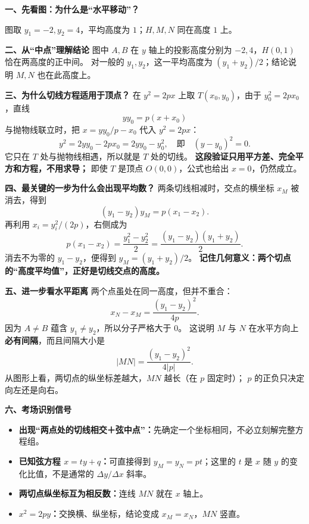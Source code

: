 \clearpage
\begin{explanationbox}
\textbf{\textcolor{CExplanation}{一、先看图：为什么是“水平移动”？}}
\par\noindent\begin{minipage}{\linewidth}
\begin{center}


图取 $y_1=-2,y_2=4$，平均高度为 $1$；$H,M,N$ 同在高度 $1$ 上。
\end{center}
\end{minipage}\par

\medskip
\textbf{\textcolor{CExplanation}{二、从“中点”理解结论}}
图中 $A,B$ 在 $y$ 轴上的投影高度分别为 $-2,4$，$H(0,1)$ 恰在两高度的正中间。
对一般的 $y_1,y_2$，这一平均高度为 $(y_1+y_2)/2$；结论说明 $M,N$ 也在此高度上。

\medskip
\textbf{\textcolor{CExplanation}{三、为什么切线方程适用于顶点？}}
在 $y^2=2px$ 上取 $T(x_0,y_0)$，由于 $y_0^2=2px_0$，直线
\[
 yy_0=p(x+x_0)
\]
与抛物线联立时，把 $x=yy_0/p-x_0$ 代入 $y^2=2px$：
\[
 y^2=2yy_0-2px_0=2yy_0-y_0^2,
 \quad\text{即}\quad (y-y_0)^2=0.
\]
它只在 $T$ 处与抛物线相遇，所以就是 $T$ 处的切线。
\textbf{这段验证只用平方差、完全平方和方程，不用求导；}
即使 $T$ 是顶点 $O(0,0)$，公式也给出 $x=0$，仍然成立。

\medskip
\textbf{\textcolor{CExplanation}{四、最关键的一步为什么会出现平均数？}}
两条切线相减时，交点的横坐标 $x_M$ 被消去，得到
\[
(y_1-y_2)y_M=p(x_1-x_2).
\]
再利用 $x_i=y_i^2/(2p)$，右侧成为
\[
 p(x_1-x_2)=\frac{y_1^2-y_2^2}{2}
 =\frac{(y_1-y_2)(y_1+y_2)}2.
\]
消去不为零的 $y_1-y_2$，便得到 $y_M=(y_1+y_2)/2$。
\textbf{记住几何意义：两个切点的“高度平均值”，正好是切线交点的高度。}

\medskip
\textbf{\textcolor{CExplanation}{五、进一步看水平距离}}
两个点虽处在同一高度，但并不重合：
\[
x_N-x_M=\frac{(y_1-y_2)^2}{4p}.
\]
因为 $A\ne B$ 蕴含 $y_1\ne y_2$，所以分子严格大于 $0$。
这说明 $M$ 与 $N$ 在水平方向上\textbf{必有间隔}，而且间隔大小是
\[
|MN|=\frac{(y_1-y_2)^2}{4|p|}.
\]
从图形上看，两切点的纵坐标差越大，$MN$ 越长（在 $p$ 固定时）；
$p$ 的正负只决定向左还是向右。

\medskip
\textbf{\textcolor{CExplanation}{六、考场识别信号}}
\begin{itemize}[leftmargin=*,itemsep=0.35em,topsep=0.3em]
\item \textbf{出现“两点处的切线相交＋弦中点”：}先确定一个坐标相同，不必立刻解完整方程组。
\item \textbf{已知弦方程 $x=ty+q$：}可直接得到 $y_M=y_N=pt$；这里的 $t$ 是 $x$ 随 $y$ 的变化比值，不是通常的 $\Delta y/\Delta x$ 斜率。
\item \textbf{两切点纵坐标互为相反数：}连线 $MN$ 就在 $x$ 轴上。
\item \textbf{$x^2=2py$：}交换横、纵坐标，结论变成 $x_M=x_N$，$MN$ 竖直。
\end{itemize}
\end{explanationbox}
